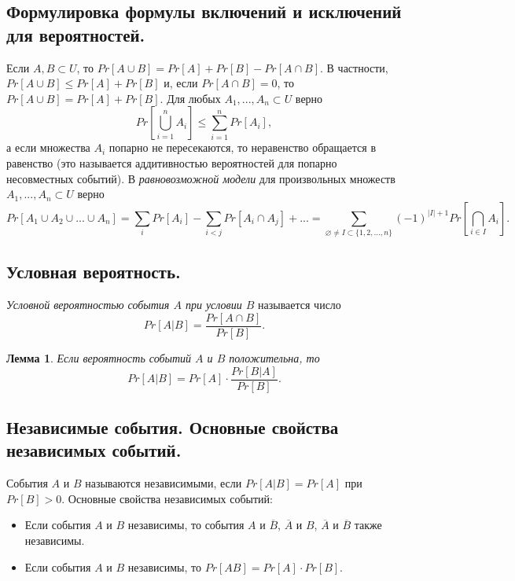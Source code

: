 \documentclass{article}
\newtheorem{lemma}{Лемма}
\begin{document}
\subsection{Формулировка формулы включений и исключений для вероятностей.}
Если $A, B \subset U$, то 
\(
Pr[A \cup B] = Pr[A] + Pr[B] - Pr[A \cap B].
\)
В частности, \(
Pr[A \cup B] \leqslant Pr[A] + Pr[B]
\) и, если $Pr[A \cap B] = 0$, то \(
Pr[A \cup B]=Pr[A]+Pr[B].
\)
\newline
\newline
Для любых $A_1, ... , A_n \subset U$ верно
\[
Pr [
\bigcup_{i=1}^n A_i
] \leqslant
\sum_{i=1}^n Pr[A_i],
\]
а если множества $A_i$ попарно не пересекаются, то неравенство обращается в равенство (это называется аддитивностью вероятностей для попарно несовместных событий).
\newline
\newline
В \textit{равновозможной модели} для произвольных множеств $A_1,...,A_n \subset U$ верно
\[
Pr[A_1 \cup A_2 \cup ... \cup A_n] = \sum_i Pr[A_i] - \sum_{i<j} Pr[A_i \cap A_j] + ... = \sum_{\varnothing \neq I \subset \{1,2,...,n\}} (-1)^{|I| + 1} Pr \left[ \bigcap_{i \in I} A_i \right].
\]


\subsection{Условная вероятность.}
\textit{Условной вероятностью события $A$ при условии $B$} называется число
\[
Pr[A | B] = \frac{Pr[A \cap B]}{Pr[B]}.
\]
\begin{lemma}
 Если вероятность событий $A$ и $B$ положительна, то
\[
Pr[A | B] = Pr[A] \cdot \frac{Pr[B | A]}{Pr[B]}.
\]
\end{lemma}


\subsection{Независимые события. Основные свойства независимых событий.}
События $A$ и $B$ называются независимыми, если $Pr[A | B] = Pr[A]$ при $Pr[B] > 0$. 
\newline
Основные свойства независимых событий:
\begin{itemize}
    \item Если события $A$ и $B$ независимы, то события $A$ и $\overline{B}$, $\overline{A}$ и $B$, $\overline{A}$ и $\overline{B}$ также независимы.
    \item Если события $A$ и $B$ независимы, то $Pr[AB] = Pr[A] \cdot Pr[B]$.
\end{itemize}
\end{document}
